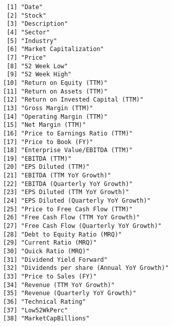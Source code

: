 \documentclass[
  letterpaper,
  DIV=11,
  numbers=noendperiod]{scrreport}
\begin{document}
\begin{verbatim}
 [1] "Date"                                   
 [2] "Stock"                                  
 [3] "Description"                            
 [4] "Sector"                                 
 [5] "Industry"                               
 [6] "Market Capitalization"                  
 [7] "Price"                                  
 [8] "52 Week Low"                            
 [9] "52 Week High"                           
[10] "Return on Equity (TTM)"                 
[11] "Return on Assets (TTM)"                 
[12] "Return on Invested Capital (TTM)"       
[13] "Gross Margin (TTM)"                     
[14] "Operating Margin (TTM)"                 
[15] "Net Margin (TTM)"                       
[16] "Price to Earnings Ratio (TTM)"          
[17] "Price to Book (FY)"                     
[18] "Enterprise Value/EBITDA (TTM)"          
[19] "EBITDA (TTM)"                           
[20] "EPS Diluted (TTM)"                      
[21] "EBITDA (TTM YoY Growth)"                
[22] "EBITDA (Quarterly YoY Growth)"          
[23] "EPS Diluted (TTM YoY Growth)"           
[24] "EPS Diluted (Quarterly YoY Growth)"     
[25] "Price to Free Cash Flow (TTM)"          
[26] "Free Cash Flow (TTM YoY Growth)"        
[27] "Free Cash Flow (Quarterly YoY Growth)"  
[28] "Debt to Equity Ratio (MRQ)"             
[29] "Current Ratio (MRQ)"                    
[30] "Quick Ratio (MRQ)"                      
[31] "Dividend Yield Forward"                 
[32] "Dividends per share (Annual YoY Growth)"
[33] "Price to Sales (FY)"                    
[34] "Revenue (TTM YoY Growth)"               
[35] "Revenue (Quarterly YoY Growth)"         
[36] "Technical Rating"                       
[37] "Low52WkPerc"                            
[38] "MarketCapBillions"                      
\end{verbatim}
\end{document}
